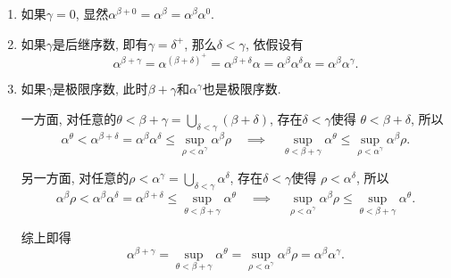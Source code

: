 \documentclass[UTF8]{ctexart}
\begin{document}
\begin{enumerate}
    \item 如果$\gamma=0$, 显然$\alpha^{\beta+0}=\alpha^\beta=\alpha^\beta\alpha^0$.
    
    \vspace{3pt}
    \item 如果$\gamma$是后继序数, 即有$\gamma=\delta^+$, 那么$\delta<\gamma$,
    依假设有
    \[
        \alpha^{\beta+\gamma}=\alpha^{(\beta+\delta)^+}=\alpha^{\beta+\delta}\alpha=
        \alpha^\beta\alpha^\delta\alpha=\alpha^\beta\alpha^\gamma.
    \]

    \vspace{3pt}
    \item 如果$\gamma$是极限序数, 此时$\beta+\gamma$和$\alpha^\gamma$也是极限序数.
    
    \vspace{3pt}\hspace{2.17em}
    一方面, 对任意的$\displaystyle\theta<\beta+\gamma=
    \bigcup_{\delta<\gamma}(\beta+\delta)$, 存在$\delta<\gamma$使得
    $\theta<\beta+\delta$, 所以
    \vspace{3pt}
    \[
        \alpha^\theta<\alpha^{\beta+\delta}=\alpha^\beta\alpha^\delta
        \leqslant\sup_{\rho<\alpha^\gamma}\alpha^\beta\rho
        \quad\implies\quad\sup_{\theta<\beta+\gamma}\alpha^\theta
        \leqslant\sup_{\rho<\alpha^\gamma}\alpha^\beta\rho.
    \]

    \vspace{3pt}\hspace{2.17em}
    另一方面, 对任意的$\displaystyle\rho<\alpha^\gamma=
    \bigcup_{\delta<\gamma}\alpha^\delta$, 存在$\delta<\gamma$使得
    $\rho<\alpha^\delta$, 所以
    \vspace{3pt}
    \[
        \alpha^\beta\rho<\alpha^\beta\alpha^\delta=\alpha^{\beta+\delta}
        \leqslant\sup_{\theta<\beta+\gamma}\alpha^\theta
        \quad\implies\quad\sup_{\rho<\alpha^\gamma}\alpha^\beta\rho
        \leqslant\sup_{\theta<\beta+\gamma}\alpha^\theta.
    \]

    \hspace{2.17em}
    综上即得
    \begin{equation*}
        \alpha^{\beta+\gamma}=\sup_{\theta<\beta+\gamma}\alpha^\theta=
        \sup_{\rho<\alpha^\gamma}\alpha^\beta\rho=\alpha^\beta\alpha^\gamma.
    \tag*{\qedsymbol}\end{equation*}
\end{enumerate}

\vspace{10pt}
\end{document}
